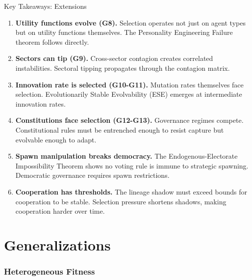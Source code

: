 \documentclass[12pt]{article}
\begin{document}
\begin{takeawaybox}{Key Takeaways: Extensions}
\begin{enumerate}
    \item \textbf{Utility functions evolve (G8).} Selection operates not just on agent types but on utility functions themselves. The Personality Engineering Failure theorem follows directly.
    
    \item \textbf{Sectors can tip (G9).} Cross-sector contagion creates correlated instabilities. Sectoral tipping propagates through the contagion matrix.
    
    \item \textbf{Innovation rate is selected (G10-G11).} Mutation rates themselves face selection. Evolutionarily Stable Evolvability (ESE) emerges at intermediate innovation rates.
    
    \item \textbf{Constitutions face selection (G12-G13).} Governance regimes compete. Constitutional rules must be entrenched enough to resist capture but evolvable enough to adapt.
    
    \item \textbf{Spawn manipulation breaks democracy.} The Endogenous-Electorate Impossibility Theorem shows no voting rule is immune to strategic spawning. Democratic governance requires spawn restrictions.
    
    \item \textbf{Cooperation has thresholds.} The lineage shadow must exceed bounds for cooperation to be stable. Selection pressure shortens shadows, making cooperation harder over time.
\end{enumerate}
\end{takeawaybox}




\part{Generalizations}

\section{Heterogeneous Fitness}
\label{sec:heterogeneous}
\end{document}
